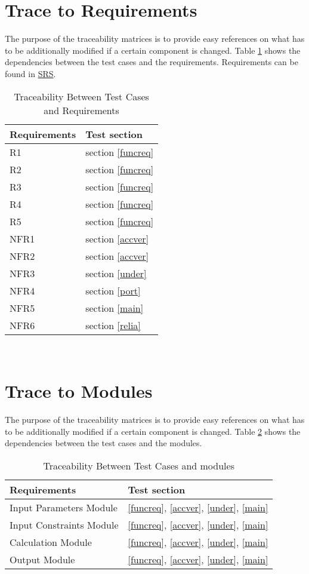 \documentclass[12pt, titlepage]{article}
\begin{document}
\section{Trace to Requirements}
The purpose of the traceability matrices is to provide easy references on what
has to be additionally modified if a certain component is changed. Table 
\ref{Tbltrace} shows the dependencies between the test cases and the 
requirements. Requirements can be found in 
\href{https://github.com/tingyuw/cas741/blob/master/docs/SRS/SRS.pdf}{SRS}.
\begin{table}[h!]
	\centering
	\begin{tabular}{l l} 
		\toprule		
		\textbf{Requirements} & \textbf{Test section}\\
		\midrule 
		R1 & section \ref{funcreq}\\
		R2 & section \ref{funcreq}\\
		R3 & section \ref{funcreq}\\
		R4 & section \ref{funcreq} \\
		R5 & section \ref{funcreq} \\
		NFR1 & section \ref{accver}\\
		NFR2 & section \ref{accver}\\
		NFR3 & section \ref{under}\\
		NFR4 & section \ref{port}\\
		NFR5 & section \ref{main}\\
		NFR6 & section \ref{relia}\\
		\bottomrule
	\end{tabular}\\
	
	\caption{Traceability Between Test Cases and Requirements} 
	\label{Tbltrace}
\end{table}
		
\section{Trace to Modules}	
The purpose of the traceability matrices is to provide easy references on what
has to be additionally modified if a certain component is changed. Table 
\ref{Tbltracemodule} shows the dependencies between the test cases and the 
modules.
\begin{table}[h!]
	\centering
	\begin{tabular}{l l} 
		\toprule		
		\textbf{Requirements} & \textbf{Test section}\\
		\midrule 
		Input Parameters Module & \ref{funcreq}, \ref{accver}, \ref{under}, 
		\ref{main}\\
		Input Constraints Module & \ref{funcreq}, \ref{accver}, \ref{under}, 
		\ref{main}\\
		Calculation Module & \ref{funcreq}, \ref{accver}, \ref{under}, 
		\ref{main}\\
		Output Module & \ref{funcreq}, \ref{accver}, \ref{under}, \ref{main} \\
		\bottomrule
	\end{tabular}\\
	
	\caption{Traceability Between Test Cases and modules} 
	\label{Tbltracemodule}
\end{table}	
\end{document}
